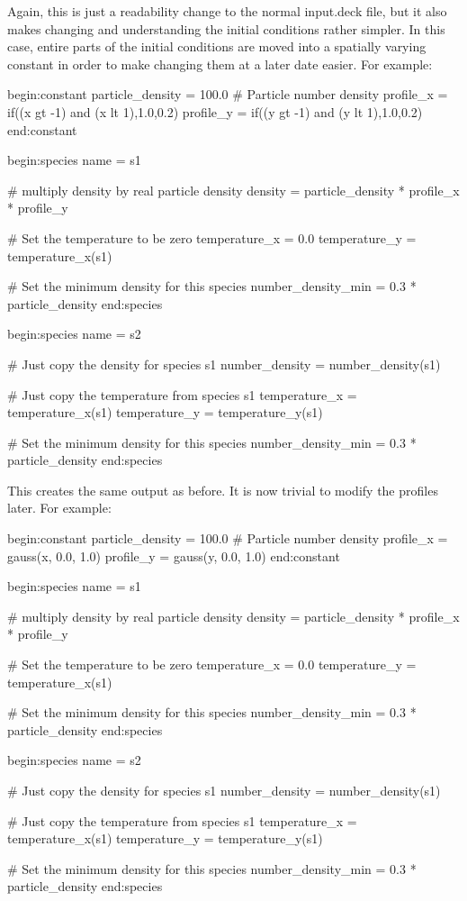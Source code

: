 Again, this is just a readability change to the normal input.deck file, but it
also makes changing and understanding the initial conditions rather
simpler. In this case, entire parts of the initial conditions are moved into a
spatially varying constant in order to make changing them at a later date
easier. For example:
\begin{boxverbatim}
begin:constant
   particle_density = 100.0 # Particle number density
   profile_x = if((x gt -1) and (x lt 1),1.0,0.2)
   profile_y = if((y gt -1) and (y lt 1),1.0,0.2)
end:constant

begin:species
   name = s1

   # multiply density by real particle density
   density = particle_density * profile_x * profile_y

   # Set the temperature to be zero
   temperature_x = 0.0
   temperature_y = temperature_x(s1)

   # Set the minimum density for this species
   number_density_min = 0.3 * particle_density
end:species

begin:species
   name = s2

   # Just copy the density for species s1
   number_density = number_density(s1)

   # Just copy the temperature from species s1
   temperature_x = temperature_x(s1)
   temperature_y = temperature_y(s1)

   # Set the minimum density for this species
   number_density_min = 0.3 * particle_density
end:species
\end{boxverbatim}

This creates the same output as before. It is now trivial to modify the
profiles later. For example:
\begin{boxverbatim}
begin:constant
   particle_density = 100.0 # Particle number density
   profile_x = gauss(x, 0.0, 1.0)
   profile_y = gauss(y, 0.0, 1.0)
end:constant

begin:species
   name = s1

   # multiply density by real particle density
   density = particle_density * profile_x * profile_y

   # Set the temperature to be zero
   temperature_x = 0.0
   temperature_y = temperature_x(s1)

   # Set the minimum density for this species
   number_density_min = 0.3 * particle_density
end:species

begin:species
   name = s2

   # Just copy the density for species s1
   number_density = number_density(s1)

   # Just copy the temperature from species s1
   temperature_x = temperature_x(s1)
   temperature_y = temperature_y(s1)

   # Set the minimum density for this species
   number_density_min = 0.3 * particle_density
end:species
\end{boxverbatim}

